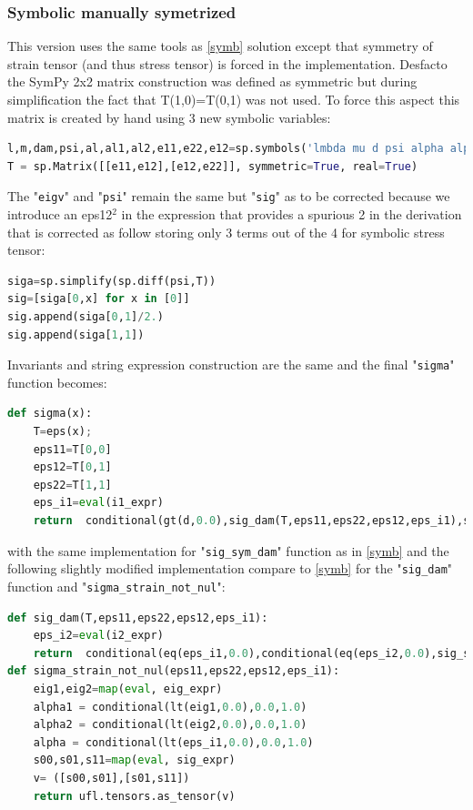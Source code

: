 \documentclass[12pt]{article}
\newcommand{\mycodepy}[1]{\textsf{"}\lstinline[language=Python]`#1`\textsf{"}}
\begin{document}
\subsubsection{Symbolic manually symetrized \label{symbsym}} 
This version uses the same tools as \ref{symb} solution except that symmetry of strain tensor (and thus stress tensor) is forced in the implementation. Desfacto the SymPy 2x2 matrix construction was defined as symmetric but during simplification the fact that T(1,0)=T(0,1)  was not used. To force this aspect this matrix is created by hand using 3 new symbolic variables:
\begin{lstlisting}[numbers=none,basicstyle=\footnotesize,language=python]
l,m,dam,psi,al,al1,al2,e11,e22,e12=sp.symbols('lmbda mu d psi alpha alpha1 alpha2 eps11 eps22 eps12')
T = sp.Matrix([[e11,e12],[e12,e22]], symmetric=True, real=True)
\end{lstlisting} 
The \mycodepy{eigv} and \mycodepy{psi} remain the same but \mycodepy{sig} as to be corrected because we introduce an eps12$^2$ in the expression that provides a spurious 2 in the derivation that is corrected as follow storing only 3 terms out of the 4 for symbolic stress tensor:
\begin{lstlisting}[numbers=none,basicstyle=\footnotesize,language=python]	 
siga=sp.simplify(sp.diff(psi,T))
sig=[siga[0,x] for x in [0]]
sig.append(siga[0,1]/2.)
sig.append(siga[1,1])
\end{lstlisting}  
Invariants and string expression construction are the same and the final \mycodepy{sigma} function becomes:
\begin{lstlisting}[numbers=none,basicstyle=\footnotesize,language=python]
def sigma(x): 
	T=eps(x);
	eps11=T[0,0]
	eps12=T[0,1]
	eps22=T[1,1]
	eps_i1=eval(i1_expr)
	return  conditional(gt(d,0.0),sig_dam(T,eps11,eps22,eps12,eps_i1),sig_sym_dam(T,eps_i1))
\end{lstlisting} 
with the same implementation for \mycodepy{sig_sym_dam} function as in \ref{symb} and the following slightly modified implementation  compare to \ref{symb} for the \mycodepy{sig_dam} function and \mycodepy{sigma_strain_not_nul}:
\begin{lstlisting}[numbers=none,basicstyle=\footnotesize,language=python]
def sig_dam(T,eps11,eps22,eps12,eps_i1):
	eps_i2=eval(i2_expr)
	return  conditional(eq(eps_i1,0.0),conditional(eq(eps_i2,0.0),sig_sym_dam(T,eps_i1),sigma_strain_not_nul(eps11,eps22,eps12,eps_i1)),sigma_strain_not_nul(eps11,eps22,eps12,eps_i1))
def sigma_strain_not_nul(eps11,eps22,eps12,eps_i1):
	eig1,eig2=map(eval, eig_expr)
	alpha1 = conditional(lt(eig1,0.0),0.0,1.0)
	alpha2 = conditional(lt(eig2,0.0),0.0,1.0)
	alpha = conditional(lt(eps_i1,0.0),0.0,1.0)
	s00,s01,s11=map(eval, sig_expr)
	v= ([s00,s01],[s01,s11])
	return ufl.tensors.as_tensor(v)
\end{lstlisting} 
\end{document}
